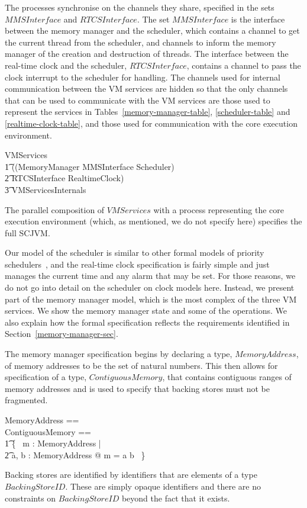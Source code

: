 \documentclass[a4paper,10pt]{report}
\begin{document}
The processes synchronise on the channels they share, specified in the
sets $MMSInterface$ and $RTCSInterface$. The set $MMSInterface$ is the interface
between the memory manager and the scheduler, which contains a channel to get
the current thread from the scheduler, and channels to inform the memory manager
of the creation and destruction of threads. The interface between the real-time
clock and the scheduler, $RTCSInterface$, contains a channel to pass the clock
interrupt to the scheduler for handling. The channels used for internal
communication between the VM services are hidden so that the only channels that
can be used to communicate with the VM services are those used to represent the
services in Tables~\ref{memory-manager-table}, \ref{scheduler-table} and
\ref{realtime-clock-table}, and those used for communication with the core
execution environment.
%
\begin{circus}
  VMServices \circdef \\
  \t1 ((MemoryManager \lpar MMSInterface \rpar Scheduler) \\
  \t2 \lpar RTCSInterface \rpar RealtimeClock) \\
  \t3 \circhide VMServicesInternals
\end{circus}
%
The parallel composition of $VMServices$ with a process representing the core
execution environment (which, as mentioned, we do not specify here)
specifies the full SCJVM.

Our model of the scheduler is similar to other formal models of priority
schedulers~\cite{ferreira2014, gotsman2013, klein2014, lime2009}, and the
real-time clock specification is fairly simple and just manages the current time
and any alarm that may be set. For those reasons, we do not go into detail on
the scheduler on clock models here. Instead, we present part of the memory
manager model, which is the most complex of the three VM services.  We show the
memory manager state and some of the operations. We also explain how the formal
specification reflects the requirements identified in
Section~\ref{memory-manager-sec}.

The memory manager specification begins by declaring a type, $MemoryAddress$, of
memory addresses to be the set of natural numbers.  This then allows for
specification of a type, $ContiguousMemory$, that contains contiguous ranges of
memory addresses and is used to specify that backing stores must not be
fragmented.
%
\begin{zed}
	MemoryAddress == \nat \\
	ContiguousMemory == \\
        \t1 \{~ m : \power MemoryAddress | \\
        \t2 \exists a, b : MemoryAddress @ m = a \upto b ~\}
\end{zed}
%
Backing stores are identified by identifiers that are elements of a type
$BackingStoreID$. These are simply opaque identifiers and there are no
constraints on $BackingStoreID$ beyond the fact that it exists.
\end{document}
